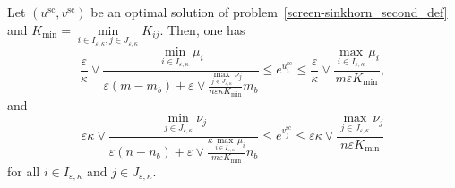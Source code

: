 \begin{proposition}
\label{prop:bounds_of_usc_and_vsc}
Let $(u^{\text{sc}}, v^{\text{sc}})$ be an optimal solution of problem~\eqref{screen-sinkhorn_second_def} and $K_{\min} = \min\limits_{i\in I_{\varepsilon,\kappa},j \in J_{\varepsilon,\kappa}}K_{ij}$. Then,
one has
\begin{equation}
\label{bound_on_u}
\frac \varepsilon\kappa \vee \frac{\min_{i \in I_{\varepsilon,\kappa}}\mu_i}{\varepsilon (m- m_b) + \varepsilon \vee \frac{\max_{j\in J_{\varepsilon,\kappa}} \nu_j}{n\varepsilon\kappa K_{\min}} m_b} \leq e^{u^{\text{sc}}_i} \leq \frac \varepsilon\kappa\vee \frac{\max_{i \in I_{\varepsilon,\kappa}} \mu_i}{m\varepsilon K_{\min}},
\end{equation}
and
\begin{equation}
\label{bound_on_v}
\varepsilon\kappa \vee \frac{\min_{j \in J_{\varepsilon,\kappa}}\nu_j}{\varepsilon(n- n_b) + \varepsilon \vee \frac{\kappa\max_{i\in I_{\varepsilon,\kappa}} \mu_i}{m\varepsilon K_{\min} } n_b} \leq e^{v^{\text{sc}}_j} \leq \varepsilon\kappa \vee \frac{\max_{j \in J_{\varepsilon,\kappa}} \nu_j}{n\varepsilon K_{\min} }
\end{equation}
for all $i\in I_{\varepsilon,\kappa}$ and $j\in J_{\varepsilon,\kappa}$.
\end{proposition}
\LinesNotNumbered
